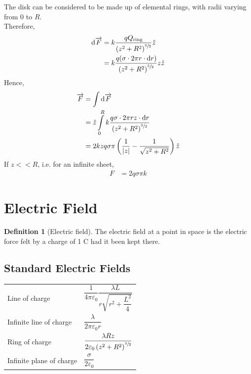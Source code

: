 \documentclass[fleqn, a4paper, 12pt, twoside]{article}
\theoremstyle{definition}
\newtheorem{definition}{Definition}
\theoremstyle{theorem}
\begin{document}
\begin{solution}
	The disk can be considered to be made up of elemental rings, with radii varying from $0$ to $R$.\\
	Therefore,
	\begin{align*}
		\dif \overrightarrow{F} &= k \dfrac{q Q_{\textnormal{ring}}}{\left( z^2 + R^2 \right)^{\sfrac{3}{2}}} \hat{z}\\
		&= k \dfrac{q (\sigma \cdot 2 \pi r \cdot \dif r)}{\left( z^2 + R^2 \right)^{\sfrac{3}{2}}} z \hat{z}
	\end{align*}
	Hence,
	\begin{align*}
		\overrightarrow{F} &= \int \dif\overrightarrow{F}\\
		&= \hat{z} \int\limits_{0}^{R} k \dfrac{q \sigma \cdot 2 \pi r z \cdot \dif r}{\left( z^2 + R^2 \right)^{\sfrac{3}{2}}}\\
		&= 2 k z q \sigma \pi \left( \dfrac{1}{|z|} - \dfrac{1}{\sqrt{z^2 + R^2}} \right)\hat{z}
	\end{align*}
	If $z << R$, i.e. for an infinite sheet,
	\begin{align*}
		F &= 2 q \sigma \pi k 
	\end{align*}
\end{solution}

\section{Electric Field}

\begin{definition}[Electric field]
	The electric field at a point in space is the electric force felt by a charge of 1 \si{\coulomb} had it been kept there.
\end{definition}

\subsection{Standard Electric Fields}

\begin{tabular}{l l}
	Line of charge & $\dfrac{1}{4 \pi \varepsilon_0} \dfrac{\lambda L}{r \sqrt{r^2 + \dfrac{L^2}{4}}}$\\
	Infinite line of charge & $\dfrac{\lambda}{2 \pi \varepsilon_0 r}$\\
	Ring of charge & $\dfrac{\lambda R z}{2 \varepsilon_0 \left( z^2 + R^2 \right)^{\sfrac{3}{2}}}$\\
	Infinite plane of charge & $\dfrac{\sigma}{2 \varepsilon_0}$
\end{tabular}
\end{document}
